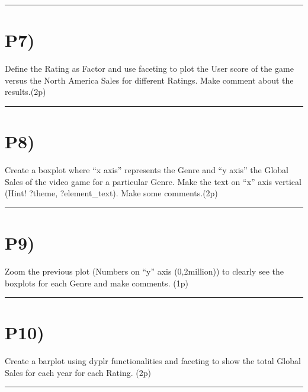 \documentclass[]{article}
\begin{document}
\begin{center}\rule{0.5\linewidth}{\linethickness}\end{center}

\section{P7)}\label{p7}

Define the Rating as Factor and use faceting to plot the User score of
the game versus the North America Sales for different Ratings. Make
comment about the results.(2p)

\begin{center}\rule{0.5\linewidth}{\linethickness}\end{center}

\section{P8)}\label{p8}

Create a boxplot where ``x axis'' represents the Genre and ``y axis''
the Global Sales of the video game for a particular Genre. Make the text
on ``x'' axis vertical (Hint! ?theme, ?element\_text). Make some
comments.(2p)

\begin{center}\rule{0.5\linewidth}{\linethickness}\end{center}

\section{P9)}\label{p9}

Zoom the previous plot (Numbers on ``y'' axis (0,2million)) to clearly
see the boxplots for each Genre and make comments. (1p)

\begin{center}\rule{0.5\linewidth}{\linethickness}\end{center}

\section{P10)}\label{p10}

Create a barplot using dyplr functionalities and faceting to show the
total Global Sales for each year for each Rating. (2p)

\begin{center}\rule{0.5\linewidth}{\linethickness}\end{center}
\end{document}
